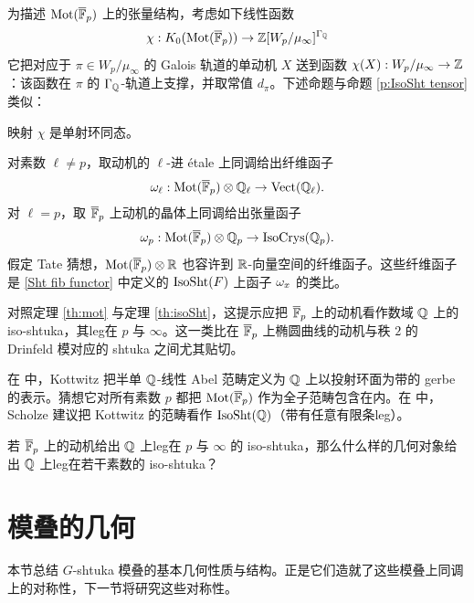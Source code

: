 为描述 $\textup{Mot}(\overline{\mathbb{F}}_{p})$ 上的张量结构，考虑如下线性函数
\begin{equation*}
\chi: K_{0}(\textup{Mot}(\overline{\mathbb{F}}_{p}))\to \mathbb{Z}[W_{p}/\mu_{\infty}]^{\Gamma_{\mathbb{Q}}}
\end{equation*}
它把对应于 $\pi\in W_{p}/\mu_{\infty}$ 的 Galois 轨道的单动机 $X$ 送到函数 $\chi(X): W_{p}/\mu_{\infty}\to \mathbb{Z}$：该函数在 $\pi$ 的 $\Gamma_{\mathbb{Q}}$-轨道上支撑，并取常值 $d_{\pi}$。下述命题与命题 \ref{p:IsoSht tensor} 类似：

\begin{prop} 映射 $\chi$ 是单射环同态。
\end{prop}

对素数 $\ell\ne p$，取动机的 $\ell$-进 étale 上同调给出纤维函子
\begin{equation*}
\omega_{\ell}: \textup{Mot}(\overline{\mathbb{F}}_{p})\otimes\mathbb{Q}_{\ell}\to \textup{Vect}(\mathbb{Q}_{\ell}).
\end{equation*}
对 $\ell=p$，取 $\overline{\mathbb{F}}_{p}$ 上动机的晶体上同调给出张量函子
\begin{equation*}
\omega_{p}: \textup{Mot}(\overline{\mathbb{F}}_{p})\otimes\mathbb{Q}_{p}\to \mathrm{IsoCrys}(\mathbb{Q}_{p}).
\end{equation*}
假定 Tate 猜想，$\textup{Mot}(\overline{\mathbb{F}}_{p})\otimes\mathbb{R}$ 也容许到 $\mathbb{R}$-向量空间的纤维函子。这些纤维函子是 \eqref{Sht fib functor} 中定义的 $\mathrm{IsoSht}(F)$ 上函子 $\omega_{x}$ 的类比。

对照定理 \ref{th:mot} 与定理 \ref{th:isoSht}，这提示应把 $\overline{\mathbb{F}}_{p}$ 上的动机看作数域 $\mathbb{Q}$ 上的 iso-shtuka，其leg在 $p$ 与 $\infty$。这一类比在 $\overline{\mathbb{F}}_{p}$ 上椭圆曲线的动机与秩 $2$ 的 Drinfeld 模对应的 shtuka 之间尤其贴切。

在 \cite{Kot} 中，Kottwitz 把半单 $\mathbb{Q}$-线性 Abel 范畴定义为 $\mathbb{Q}$ 上以投射环面为带的 gerbe 的表示。猜想它对所有素数 $p$ 都把 $\textup{Mot}(\overline{\mathbb{F}}_{p})$ 作为全子范畴包含在内。在 \cite{SchICM} 中，Scholze 建议把 Kottwitz 的范畴看作 $\mathrm{IsoSht}(\mathbb{Q})$（带有任意有限条leg）。

\begin{ques} 若 $\overline{\mathbb{F}}_{p}$ 上的动机给出 $\mathbb{Q}$ 上leg在 $p$ 与 $\infty$ 的 iso-shtuka，那么什么样的几何对象给出 $\mathbb{Q}$ 上leg在若干素数的 iso-shtuka？
\end{ques}

\section{模叠的几何}\label{s:geom}
本节总结 $G$-shtuka 模叠的基本几何性质与结构。正是它们造就了这些模叠上同调上的对称性，下一节将研究这些对称性。

